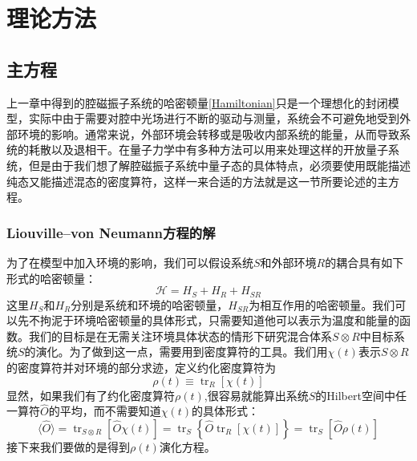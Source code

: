 
\chapter{理论方法}
\label{ch3}

\section{主方程}
上一章中得到的腔磁振子系统的哈密顿量\eqref{Hamiltonian}只是一个理想化的封闭模型，实际中由于需要对腔中光场进行不断的驱动与测量，系统会不可避免地受到外部环境的影响。通常来说，外部环境会转移或是吸收内部系统的能量，从而导致系统的耗散以及退相干。在量子力学中有多种方法可以用来处理这样的开放量子系统，但是由于我们想了解腔磁振子系统中量子态的具体特点，必须要使用既能描述纯态又能描述混态的密度算符，这样一来合适的方法就是这一节所要论述的主方程。

\subsection{Liouville--von Neumann方程的解}
为了在模型中加入环境的影响，我们可以假设系统$S$和外部环境$R$的耦合具有如下形式的哈密顿量：
\begin{equation}
\mathcal{H}=H_{S}+H_{R}+H_{S R}
\label{Hsr}
\end{equation}
这里$H_{S}$和$H_{R}$分别是系统和环境的哈密顿量，$H_{SR}$为相互作用的哈密顿量。我们可以先不拘泥于环境哈密顿量的具体形式，只需要知道他可以表示为温度和能量的函数。我们的目标是在无需关注环境具体状态的情形下研究混合体系$S \otimes R$中目标系统$S$的演化。为了做到这一点，需要用到密度算符的工具。我们用$\chi(t)$表示$S \otimes R$的密度算符并对环境的部分求迹，定义约化密度算符为
\begin{equation}
\rho(t) \equiv \operatorname{tr}_{R}[\chi(t)]
\end{equation}
显然，如果我们有了约化密度算符$\rho(t)$,很容易就能算出系统$S$的Hilbert空间中任一算符$\hat{O}$的平均，而不需要知道$\chi(t)$的具体形式：
\begin{equation}
\langle\hat{O}\rangle=\operatorname{tr}_{S \otimes R}[\hat{O} \chi(t)]=\operatorname{tr}_{S}\left\{\hat{O} \operatorname{tr}_{R}[\chi(t)]\right\}=\operatorname{tr}_{S}[\hat{O} \rho(t)]
\end{equation}
接下来我们要做的是得到$\rho(t)$演化方程。

